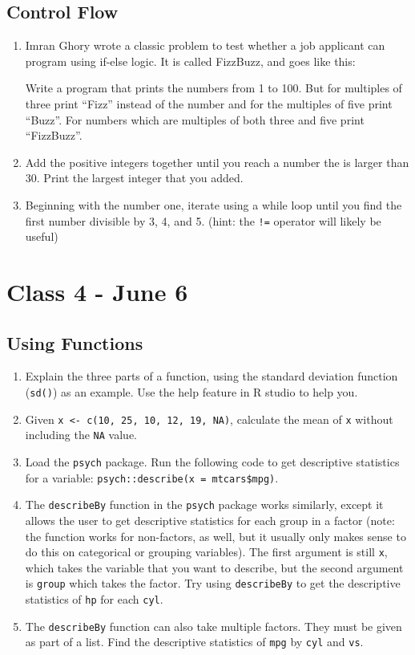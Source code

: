 \documentclass[letterpaper,12pt]{article}
\begin{document}
\subsection{Control Flow}

\begin{enumerate}
    \item Imran Ghory wrote a classic problem to test whether a job applicant can program using if-else logic. It is called FizzBuzz, and goes like this: 
    \begin{displayquote}
    Write a program that prints the numbers from 1 to 100. But for multiples of three print “Fizz” instead of the number and for the multiples of five print “Buzz”. For numbers which are multiples of both three and five print “FizzBuzz”.
    \end{displayquote}
    \item Add the positive integers together until you reach a number the is larger than 30. Print the largest integer that you added. 
    \item Beginning with the number one, iterate using a while loop until you find the first number divisible by 3, 4, and 5. (hint: the \verb|!=| operator will likely be useful)
\end{enumerate}

\section{Class 4 - June 6}

\subsection{Using Functions}

\begin{enumerate}
    \item Explain the three parts of a function, using the standard deviation function (\verb|sd()|) as an example. 
    Use the help feature in R studio to help you.
    \item Given \verb|x <- c(10, 25, 10, 12, 19, NA)|, calculate the mean of \verb|x| without including the \verb|NA| value. 
    \item Load the \verb|psych| package. 
    Run the following code to get descriptive statistics for a variable: \verb|psych::describe(x = mtcars$mpg)|.
    \item The \verb|describeBy| function in the \verb|psych| package works similarly, except it allows the user to get descriptive statistics for each group in a factor (note: the function works for non-factors, as well, but it usually only makes sense to do this on categorical or grouping variables). 
    The first argument is still \verb|x|, which takes the variable that you want to describe, but the second argument is \verb|group| which takes the factor. 
    Try using \verb|describeBy| to get the descriptive statistics of \verb|hp| for each \verb|cyl|. 
    \item The \verb|describeBy| function can also take multiple factors. 
    They must be given as part of a list. 
    Find the descriptive statistics of \verb|mpg| by \verb|cyl| and \verb|vs|.
\end{enumerate}
\end{document}
